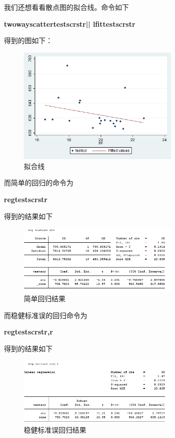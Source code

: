 \documentclass[cn,10pt,math=newtx,citestyle=gb7714-2015,bibstyle=gb7714-2015]{elegantbook}
\begin{document}
	我们还想看看散点图的拟合线。命令如下
	
	\textbf{twoway\quad scatter\quad testscr\quad str\quad || lfit\quad testscr\quad str}
	
	得到的图如下：
	\begin{figure}[htbp]
		\centering
		\includegraphics[width=0.7\textwidth]{line.png}
		\caption{拟合线}\label{fig:digit}
	\end{figure}
	
	而简单的回归的命令为
	
	\textbf{reg\quad testscr\quad str}
	
	得到的结果如下
	\begin{figure}[htbp]
		\centering
		\includegraphics[width=0.7\textwidth]{reg.png}
		\caption{简单回归结果}\label{fig:digit}
	\end{figure}
	
	而稳健标准误的回归命令为
	
	\textbf{reg\quad testscr\quad str,r}
	
	得到的结果如下
	\begin{figure}[htbp]
		\centering
		\includegraphics[width=0.7\textwidth]{regr.png}
		\caption{稳健标准误回归结果}\label{fig:digit}
	\end{figure}
	
\end{document}
